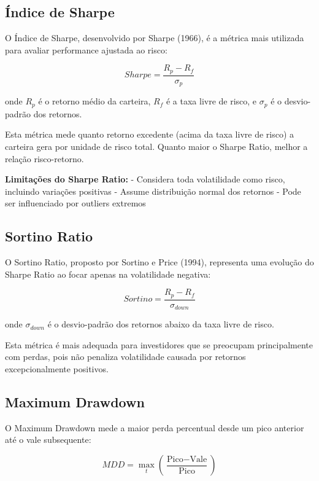 \subsection{Índice de Sharpe}

O Índice de Sharpe, desenvolvido por Sharpe (1966), é a métrica mais utilizada para avaliar performance ajustada ao risco:

\begin{equation}
Sharpe = \frac{R_p - R_f}{\sigma_p}
\end{equation}

onde $R_p$ é o retorno médio da carteira, $R_f$ é a taxa livre de risco, e $\sigma_p$ é o desvio-padrão dos retornos.

Esta métrica mede quanto retorno excedente (acima da taxa livre de risco) a carteira gera por unidade de risco total. Quanto maior o Sharpe Ratio, melhor a relação risco-retorno.

\textbf{Limitações do Sharpe Ratio:}
- Considera toda volatilidade como risco, incluindo variações positivas
- Assume distribuição normal dos retornos
- Pode ser influenciado por outliers extremos

\subsection{Sortino Ratio}

O Sortino Ratio, proposto por Sortino e Price (1994), representa uma evolução do Sharpe Ratio ao focar apenas na volatilidade negativa:

\begin{equation}
Sortino = \frac{R_p - R_f}{\sigma_{down}}
\end{equation}

onde $\sigma_{down}$ é o desvio-padrão dos retornos abaixo da taxa livre de risco.

Esta métrica é mais adequada para investidores que se preocupam principalmente com perdas, pois não penaliza volatilidade causada por retornos excepcionalmente positivos.

\subsection{Maximum Drawdown}

O Maximum Drawdown mede a maior perda percentual desde um pico anterior até o vale subsequente:

\begin{equation}
MDD = \max_{t} \left( \frac{\text{Pico} - \text{Vale}}{\text{Pico}} \right)
\end{equation}

